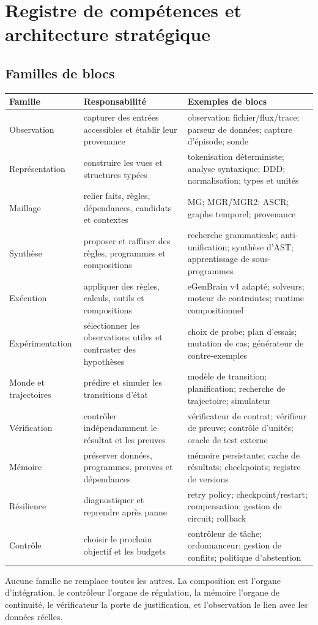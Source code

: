 \documentclass[11pt,a4paper]{article}
\begin{document}
\section{Registre de compétences et architecture stratégique}
\subsection{Familles de blocs}
\begin{longtable}{p{}p{}p{}}
\toprule Famille & Responsabilité & Exemples de blocs \\
\midrule
Observation & capturer des entrées accessibles et établir leur provenance & observation fichier/flux/trace; parseur de données; capture d'épisode; sonde \\
Représentation & construire les vues et structures typées & tokenisation déterministe; analyse syntaxique; DDD; normalisation; types et unités \\
Maillage & relier faits, règles, dépendances, candidats et contextes & MG; MGR/MGR2; ASCR; graphe temporel; provenance \\
Synthèse & proposer et raffiner des règles, programmes et compositions & recherche grammaticale; anti-unification; synthèse d'AST; apprentissage de sous-programmes \\
Exécution & appliquer des règles, calculs, outils et compositions & eGenBrain v4 adapté; solveurs; moteur de contraintes; runtime compositionnel \\
Expérimentation & sélectionner les observations utiles et contraster des hypothèses & choix de probe; plan d'essais; mutation de cas; générateur de contre-exemples \\
Monde et trajectoires & prédire et simuler les transitions d'état & modèle de transition; planification; recherche de trajectoire; simulateur \\
Vérification & contrôler indépendamment le résultat et les preuves & vérificateur de contrat; vérifieur de preuve; contrôle d'unités; oracle de test externe \\
Mémoire & préserver données, programmes, preuves et dépendances & mémoire persistante; cache de résultats; checkpoints; registre de versions \\
Résilience & diagnostiquer et reprendre après panne & retry policy; checkpoint/restart; compensation; gestion de circuit; rollback \\
Contrôle & choisir le prochain objectif et les budgets & contrôleur de tâche; ordonnanceur; gestion de conflits; politique d'abstention \\
\bottomrule
\end{longtable}
Aucune famille ne remplace toutes les autres. La composition est l'organe d'intégration, le contrôleur l'organe de régulation, la mémoire l'organe de continuité, le vérificateur la porte de justification, et l'observation le lien avec les données réelles.
\end{document}
